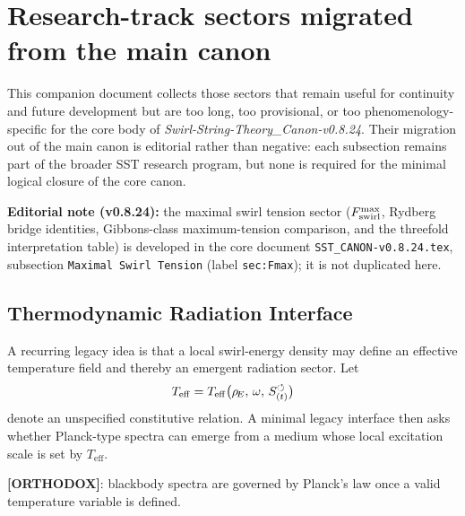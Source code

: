 \makeatletter
{}
\makeatother


\section{Research-track sectors migrated from the main canon}

\noindent
This companion document collects those sectors that remain useful for continuity and future development but are too long, too provisional, or too phenomenology-specific for the core body of \textit{Swirl-String-Theory\_Canon-v0.8.24}. Their migration out of the main canon is editorial rather than negative: each subsection remains part of the broader SST research program, but none is required for the minimal logical closure of the core canon.

\medskip
\noindent
\textbf{Editorial note (v0.8.24):} the maximal swirl tension sector ($F_{\rm swirl}^{\max}$, Rydberg bridge identities, Gibbons-class maximum-tension comparison, and the threefold interpretation table) is developed in the core document \texttt{SST\_CANON-v0.8.24.tex}, subsection \texttt{Maximal Swirl Tension} (label \texttt{sec:Fmax}); it is not duplicated here.

\medskip








\subsection{Thermodynamic Radiation Interface}
A recurring legacy idea is that a local swirl-energy density may define an effective temperature field and thereby an emergent radiation sector. Let
\begin{align}
    T_{\mathrm{eff}} = T_{\mathrm{eff}}\big(\rho_{\!E},\, \omega,\, S_{(t)}^{\boldsymbol{\circlearrowleft}}\big)
\end{align}
denote an unspecified constitutive relation. A minimal legacy interface then asks whether Planck-type spectra can emerge from a medium whose local excitation scale is set by $T_{\mathrm{eff}}$.

\textbf{[ORTHODOX]}: blackbody spectra are governed by Planck's law once a valid temperature variable is defined.

